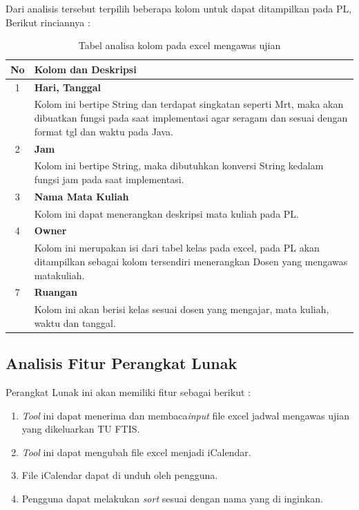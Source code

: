 Dari analisis tersebut terpilih beberapa kolom untuk dapat ditampilkan pada PL, Berikut rinciannya :
\begin{table}[H]
		\centering
		\caption{Tabel analisa kolom pada excel mengawas ujian}
		\label{tab:analisa_kolom}
\begin{tabular}{|c|p{12cm}|}
		\hline
		\textbf{No} & \textbf{Kolom dan Deskripsi} \\ \hline \hline
		1 & \textbf{Hari, Tanggal}\\
			&	Kolom ini bertipe String dan terdapat singkatan seperti Mrt, maka akan dibuatkan fungsi pada saat implementasi agar seragam dan sesuai dengan format tgl dan waktu pada Java.\\ \hline	
		2 & \textbf{Jam}\\
			&	Kolom ini bertipe String, maka dibutuhkan konversi String kedalam fungsi jam pada saat implementasi.\\ \hline
		3 & \textbf{Nama Mata Kuliah}\\
			&	Kolom ini dapat menerangkan deskripsi mata kuliah pada PL.\\ \hline
		4 & \textbf{Owner}\\
			&	Kolom ini merupakan isi dari tabel kelas pada excel, pada PL akan ditampilkan sebagai kolom tersendiri menerangkan Dosen yang mengawas matakuliah.\\ \hline		
		7 & \textbf{Ruangan}\\
			&	Kolom ini akan berisi kelas sesuai dosen yang mengajar, mata kuliah, waktu dan tanggal.\\ \hline
	\end{tabular}
\end{table}

\subsection{Analisis Fitur Perangkat Lunak}
Perangkat Lunak ini akan memiliki fitur sebagai berikut : 
	\begin{enumerate}
		\item \textit{Tool} ini dapat menerima dan membaca\textit{input} file excel jadwal mengawas ujian yang dikeluarkan TU FTIS.
		\item \textit{Tool} ini dapat mengubah file excel menjadi iCalendar.
		\item File iCalendar dapat di unduh oleh pengguna.
		\item Pengguna dapat melakukan \textit{sort} sesuai dengan nama yang di inginkan.
	\end{enumerate}
	
